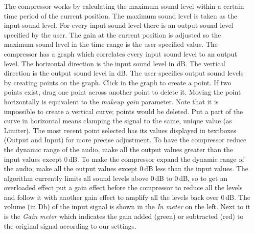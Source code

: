 The compressor works by calculating the maximum sound level within a certain time period of the current position. The maximum sound level is taken as the input sound level. For every input sound level there is an output sound level specified by the user.
The gain at the current position is adjusted so the maximum sound level in the time range is the user specified value.
The compressor has a graph which correlates every input sound level to an output level. The horizontal direction is the input sound level in dB. The vertical direction is the output sound level in dB. The user specifies output sound levels by creating points on the graph. Click in the graph to create a point. If two points exist, drag one point across another point to delete it. Moving the point horizontally is equivalent to the \textit{makeup gain} parameter. Note that it is impossible to create a vertical curve; points would be deleted.
Put a part of the curve in horizontal means clamping the signal to the same, unique value (as Limiter).
The most recent point selected has its values displayed in textboxes (Output and Input) for more precise adjustment.
To have the compressor reduce the dynamic range of the audio, make all the output values greater than the input values except 0\,dB. To make the compressor expand the dynamic range of the audio, make all the output values except 0\,dB less than the input values. The algorithm currently limits all sound levels above 0\,dB to 0\,dB, so to get an overloaded effect put a gain effect before the compressor to reduce all the levels and follow it with another gain effect to amplify all the levels back over 0\,dB.
The volume (in Db) of the input signal is shown in the \textit{In meter} on the left. Next to it is the \textit{Gain meter} which indicates the gain added (green) or subtracted (red) to the original signal according to our settings.

